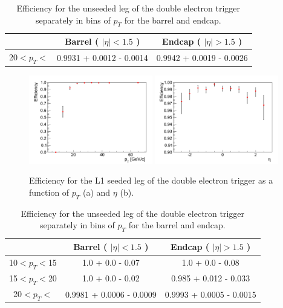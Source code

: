 \begin{table}[!ht]
\begin{center}
\begin{tabular}{|c|c|c|} \hline
              & Barrel ( $|\eta|<1.5$ )  & Endcap ( $|\eta|>1.5$ )  \\ 
\hline
20$<p_{T}<$   & 0.9931 + 0.0012 - 0.0014 & 0.9942 + 0.0019 - 0.0026 \\
\hline
\end{tabular}
\caption{Efficiency for the unseeded leg of the double electron trigger 
separately in bins of $p_{T}$ for the barrel and endcap.
\label{tab:Ele17Ele8TriggerEfficiencySeededLeg}}
\end{center}
\end{table}


\begin{figure}[!ht]
\begin{center}
\includegraphics[width=0.48\textwidth]{figures/ElectronTriggerEffVsPt_Ele17Ele8WithL1Seed.pdf}
\includegraphics[width=0.48\textwidth]{figures/ElectronTriggerEffVsEta_Ele17Ele8WithL1Seed.pdf}
\end{center}
\caption{Efficiency for the L1 seeded leg of the double electron trigger as a function of $p_{T}$ (a) and $\eta$ (b).}
\label{fig:Ele17Ele8TriggerEfficiencySeededLeg}
\end{figure} 


\begin{table}[!ht]
\begin{center}
\begin{tabular}{|c|c|c|} 
\hline
              & Barrel ( $|\eta|<1.5$ )  & Endcap ( $|\eta|>1.5$ )  \\ 
\hline
10$<p_{T}<$15 & 1.0 + 0.0 - 0.07 & 1.0 + 0.0 - 0.08                 \\
15$<p_{T}<$20 & 1.0 + 0.0 - 0.02 & 0.985 + 0.012 - 0.033            \\
20$<p_{T}<$   & 0.9981 + 0.0006 - 0.0009 & 0.9993 + 0.0005 - 0.0015 \\
\hline
\end{tabular}
\caption{Efficiency for the unseeded leg of the double electron trigger 
separately in bins of $p_{T}$ for the barrel and endcap.
\label{tab:Ele17Ele8TriggerEfficiencyUnseededLeg}}
\end{center}
\end{table}


